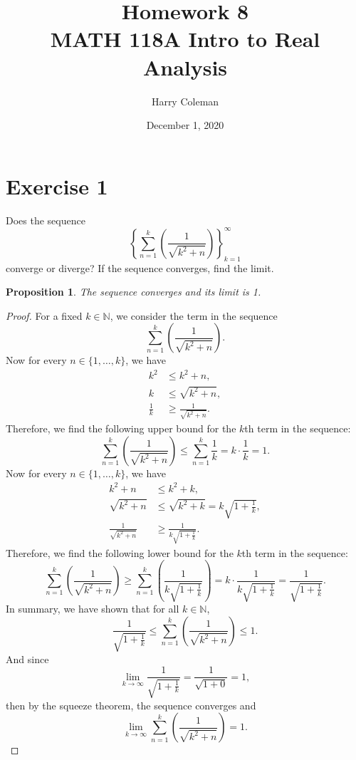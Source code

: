 \documentclass[12pt]{article}
\newtheorem{proposition}{Proposition}
\newenvironment{problem}
    {\begin{lrbox}{\mybox}\begin{minipage}{0.98\textwidth}}
    {\end{minipage}\end{lrbox}\framebox[\textwidth]{\usebox{\mybox}}}
\newcommand{\N}{\mathbb{N}} %
\newcommand{\<}{\left\langle} %
\renewcommand{\>}{\right\rangle} %
\begin{document}
 
\title{Homework 8\\
    \large MATH 118A Intro to Real Analysis
}
\author{Harry Coleman}
\date{December 1, 2020}
\maketitle

\section*{Exercise 1}
\begin{problem}
    Does the sequence 
    \[
     \left \{ \sum_{n=1}^k \left ( \frac{1}{\sqrt{k^2+n}} \right )\right \}_{k=1}^\infty
    \]
    converge or diverge? If the sequence converges, find the limit.
    
\end{problem}

\begin{proposition}
    The sequence converges and its limit is 1.
\end{proposition}

\begin{proof}
    For a fixed $k \in \N$, we consider the term in the sequence
    \[\sum_{n=1}^k \left( \frac{1}{\sqrt{k^2+n}} \right).\]
    Now for every $n \in \{1, \dots, k\}$, we have
    \begin{align*}
        k^2 &\leq k^2 + n, \\
        k &\leq \sqrt{k^2 + n}, \\
        \frac1k &\geq \frac1{\sqrt{k^2 + n}}.
    \end{align*}
    Therefore, we find the following upper bound for the $k$th term in the sequence:
    \[\sum_{n=1}^k \left( \frac{1}{\sqrt{k^2+n}} \right) \leq \sum_{n=1}^k \frac1k = k \cdot \frac1k = 1.\]
    Now for every $n \in \{1, \dots, k\}$, we have
    \begin{align*}
        k^2 + n &\leq k^2 + k, \\
        \sqrt{k^2 + n} &\leq \sqrt{k^2 + k} = k\sqrt{1 + \frac1k}, \\
        \frac1{\sqrt{k^2 + n}} &\geq \frac1{k\sqrt{1 + \frac1k}}.
    \end{align*}
    Therefore, we find the following lower bound for the $k$th term in the sequence:
    \[\sum_{n=1}^k \left( \frac{1}{\sqrt{k^2+n}} \right) \geq \sum_{n=1}^k \left( \frac1{k\sqrt{1 + \frac1k}} \right) = k \cdot \frac1{k\sqrt{1 + \frac1k}} = \frac1{\sqrt{1 + \frac1k}}.\]
    In summary, we have shown that for all $k \in \N$,
    \[\frac1{\sqrt{1 + \frac1k}} \leq \sum_{n=1}^k \left( \frac{1}{\sqrt{k^2+n}} \right) \leq 1.\]
    And since
    \[\lim_{k \to \infty} \frac1{\sqrt{1 + \frac1k}} = \frac1{\sqrt{1 + 0}} = 1,\]
    then by the squeeze theorem, the sequence converges and
    \[\lim_{k \to \infty} \sum_{n=1}^k \left( \frac{1}{\sqrt{k^2+n}} \right) = 1.\]
    
\end{proof}
\end{document}

